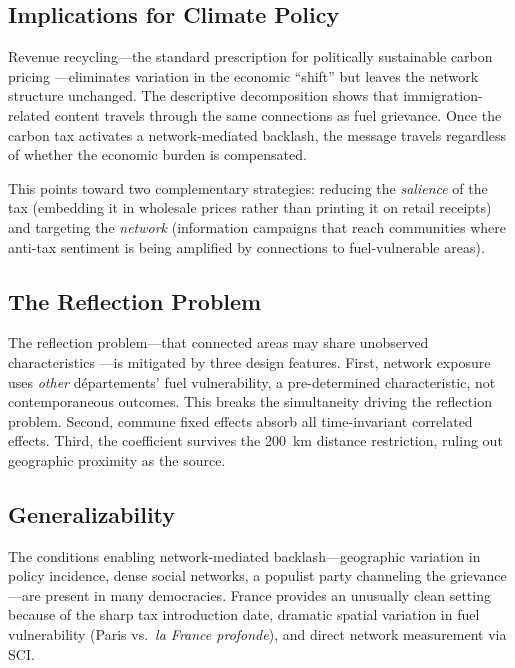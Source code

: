 \documentclass[12pt]{article}
\newcommand{\depts}{d\'{e}partements}
\begin{document}
\subsection{Implications for Climate Policy}

Revenue recycling---the standard prescription for politically sustainable carbon pricing \citep{klenert2018carbon, stiglitz2019addressing}---eliminates variation in the economic ``shift'' but leaves the network structure unchanged. The descriptive decomposition shows that immigration-related content travels through the same connections as fuel grievance. Once the carbon tax activates a network-mediated backlash, the message travels regardless of whether the economic burden is compensated.

This points toward two complementary strategies: reducing the \emph{salience} of the tax (embedding it in wholesale prices rather than printing it on retail receipts) and targeting the \emph{network} (information campaigns that reach communities where anti-tax sentiment is being amplified by connections to fuel-vulnerable areas).

\subsection{The Reflection Problem}

The reflection problem---that connected areas may share unobserved characteristics \citep{manski1993identification}---is mitigated by three design features.
First, network exposure uses \emph{other} \depts{}' fuel vulnerability, a pre-determined characteristic, not contemporaneous outcomes.
This breaks the simultaneity driving the reflection problem.
Second, commune fixed effects absorb all time-invariant correlated effects.
Third, the coefficient survives the 200~km distance restriction, ruling out geographic proximity as the source.

\subsection{Generalizability}

The conditions enabling network-mediated backlash---geographic variation in policy incidence, dense social networks, a populist party channeling the grievance---are present in many democracies. France provides an unusually clean setting because of the sharp tax introduction date, dramatic spatial variation in fuel vulnerability (Paris vs.\ \textit{la France profonde}), and direct network measurement via SCI.
\end{document}
